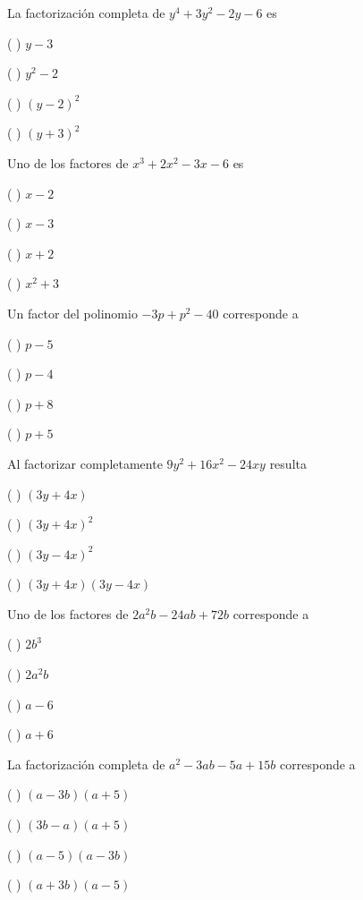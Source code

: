 \documentclass[fleqn]{article}
\begin{document}
\pagebreak


\item La factorización completa de $y^4+3y^2-2y-6$ es
\vs

\benu
\item[] (  ) $y-3$
\item[] (  ) $y^2-2$
\item[] (  ) $(y-2)^2$
\item[] (  ) $(y+3)^2$
\eenu
\vs\vs

\item Uno de los factores de $x^3+2x^2-3x-6$ es
\vs

\benu
\item[] (  ) $x-2$
\item[] (  ) $x-3$
\item[] (  ) $x+2$
\item[] (  ) $x^2+3$
\eenu
\vs

\item Un factor del polinomio $-3p+p^2-40$ corresponde a
\vs

\benu
\item[] (  ) $p-5$
\item[] (  ) $p-4$
\item[] (  ) $p+8$
\item[] (  ) $p+5$
\eenu
\vs

\item Al factorizar completamente $9y^2+16x^2-24xy$ resulta
\vs

\benu
\item[] (  ) $(3y+4x)$
\item[] (  ) $(3y+4x)^2$
\item[] (  ) $(3y-4x)^2$
\item[] (  ) $(3y+4x)(3y-4x)$
\eenu
\vs

\item Uno de los factores de $2a^2b-24ab+72b$ corresponde a
\vs

\benu
\item[] (  ) $2b^3$
\item[] (  ) $2a^2b$
\item[] (  ) $a-6$
\item[] (  ) $a+6$
\eenu
\vs\vs

\pagebreak

\item La factorización completa de $a^2-3ab-5a+15b$ corresponde a
\vs

\benu
\item[] (  ) $(a-3b)(a+5)$
\item[] (  ) $(3b-a)(a+5)$
\item[] (  ) $(a-5)(a-3b)$
\item[] (  ) $(a+3b)(a-5)$
\eenu
\vs
\end{document}
